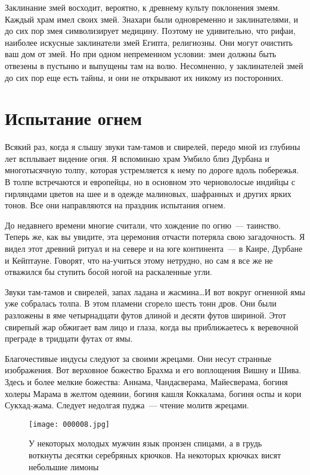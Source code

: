\documentclass[12pt,a4paper,twoside,openany,svgnames]{memoir}
\begin{document}
Заклинание змей восходит, вероятно, к древнему культу поклонения змеям. Каждый храм имел своих змей. Знахари были одновременно и заклинателями, и до сих пор змея символизирует медицину. Поэтому не удивительно, что рифаи, наиболее искусные заклинатели змей Египта, религиозны. Они могут очистить ваш дом от змей. Но при одном непременном условии: змеи должны быть отвезены в пустыню и выпущены там на волю. Несомненно, у заклинателей змей до сих пор еще есть тайны, и они не открывают их никому из посторонних.

\chapter{Испытание огнем}

Всякий раз, когда я слышу звуки там-тамов и свирелей, передо мной из глубины лет всплывает видение огня. Я вспоминаю храм Умбило близ Дурбана и многотысячную толпу, которая устремляется к нему по дороге вдоль побережья. В толпе встречаются и европейцы, но в основном это черноволосые индийцы с гирляндами цветов на шее и в одежде малиновых, шафранных и других ярких тонов. Все они направляются на праздник испытания огнем.

До недавнего времени многие считали, что хождение по огню~--- таинство. Теперь же, как вы увидите, эта церемония отчасти потеряла свою загадочность. Я видел этот древний ритуал и на севере и на юге континента~--- в Каире, Дурбане и Кейптауне. Говорят, что на-учиться этому нетрудно, но сам я все же не отважился бы ступить босой ногой на раскаленные угли.

Звуки там-тамов и свирелей, запах ладана и жасмина\ldots И вот вокруг огненной ямы уже собралась толпа. В этом пламени сгорело шесть тонн дров. Они были разложены в яме четырнадцати футов длиной и десяти футов шириной. Этот свирепый жар обжигает вам лицо и глаза, когда вы приближаетесь к веревочной преграде в тридцати футах от ямы.

Благочестивые индусы следуют за своими жрецами. Они несут странные изображения. Вот верховное божество Брахма и его воплощения Вишну и Шива. Здесь и более мелкие божества: Аннама, Чандасверама, Майесверама, богиня холеры Марама в желтом одеянии, богиня кашля Коккалама, богиня оспы и кори Сукхад-жама. Следует недолгая пуджа~--- чтение молитв жрецами.

\begin{figure}[ht!]
\centering
\texttt{[image: 000008.jpg]}
\caption{У некоторых молодых мужчин язык пронзен спицами, а в грудь воткнуты десятки серебряных крючков. На некоторых крючках висят небольшие лимоны}
\label{overflow}
\end{figure}
\end{document}
